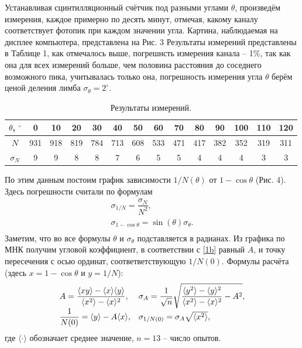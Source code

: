 \documentclass[a4paper, 12pt]{article}%
\begin{document}
Устанавливая сцинтилляционный счётчик под разными углами $\theta$, произведём измерения, каждое примерно по десять минут, отмечая, какому каналу соответствует фотопик при каждом значении угла. Картина, наблюдаемая на дисплее компьютера, представлена на Рис. 3
Результаты измерений представлены в Таблице 1, как отмечалось выше, погрешнсть измерения канала -- 1\%, так как она для всех измерений больше, чем половина расстояния до соседнего возможного пика, учитывалась только она, погрешность измерения угла $\theta$ берём ценой деления лимба $\sigma_\theta = 2^\circ$.
\begin{table}[h]
\begin{tabular}{|c|c|c|c|c|c|c|c|c|c|c|c|c|c|}
\hline
$\theta$, $^\circ$ & 0   & 10  & 20  & 30  & 40  & 50  & 60  & 70  & 80  & 90  & 100 & 110 & 120 \\ \hline
$N$                & 931 & 918 & 819 & 784 & 713 & 608 & 533 & 471 & 417 & 382 & 352 & 319 & 311 \\ \hline
$\sigma_N$         & 9   & 9   & 8   & 8   & 7   & 6   & 5   & 5   & 4   & 4   & 4   & 3   & 3   \\ \hline
\end{tabular}
\centering
\caption{Результаты измерений.}
\end{table}
По этим данным постоим график зависимости $1/N(\theta)$ от $1-\cos \theta$ (Рис. 4). Здесь погрешности считали по формулам
\[\begin{array}{l}
\sigma_{1/N} = \dfrac{\sigma_N}{N^2},\\
\sigma_{1-\cos \theta} = \sin(\theta) \sigma_\theta.\\
\end{array}\]
Заметим, что во все формулы $\theta$ и $\sigma_\theta$ подставляется в радианах. Из графика по МНК получим угловой коэффициент, в соответствии с \eqref{1b} равный $A$, и точку пересечения с осью ординат, соответветствующую $1/N(0)$. Формулы расчёта (здесь $x = 1 -\cos\theta$ и $y = 1/N$):
\[\begin{array}{l l}
A = \dfrac{\langle xy \rangle - \langle x \rangle \langle y \rangle}{\langle x^2 \rangle - \langle x \rangle^2}, & \sigma_A = \dfrac{1}{\sqrt{n}}\sqrt{\dfrac{\langle y^2 \rangle - \langle y \rangle^2}{\langle x^2 \rangle - \langle x \rangle^2} - A^2},\\
\dfrac{1}{N(0)} = \langle y \rangle - A \langle x \rangle, & \sigma_{1/N(0)} = \sigma_A \sqrt{\langle x^2\rangle},\\
\end{array}\]
где $\langle \cdot \rangle$ обозначает среднее значение, $n = 13$ -- число опытов.
\end{document}
